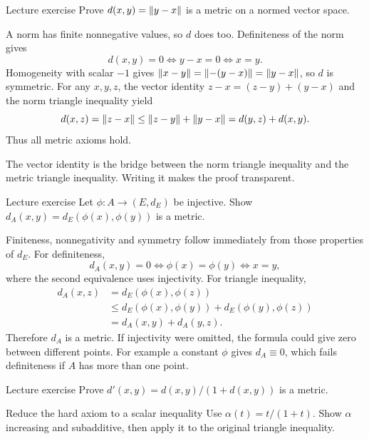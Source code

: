 \begin{exam}{Lecture exercise}
Prove $d(x,y)=\left\lVert y-x\right\rVert$ is a metric on a normed vector space.
\end{exam}
\begin{answer}
A norm has finite nonnegative values, so $d$ does too. Definiteness of the norm gives
\[d(x,y)=0\iff y-x=0\iff x=y.\]
Homogeneity with scalar $-1$ gives $\left\lVert x-y\right\rVert=\left\lVert-(y-x)\right\rVert=\left\lVert y-x\right\rVert$, so $d$ is symmetric. For any $x,y,z$, the vector identity $z-x=(z-y)+(y-x)$ and the norm triangle inequality yield
\[d(x,z)=\left\lVert z-x\right\rVert\le\left\lVert z-y\right\rVert+\left\lVert y-x\right\rVert=d(y,z)+d(x,y).\]
Thus all metric axioms hold.
\end{answer}
\begin{tip}
The vector identity is the bridge between the norm triangle inequality and the metric triangle inequality. Writing it makes the proof transparent.
\end{tip}
\begin{exam}{Lecture exercise}
Let $\phi:A\to(E,d_E)$ be injective. Show $d_A(x,y)=d_E(\phi(x),\phi(y))$ is a metric.
\end{exam}
\begin{answer}
Finiteness, nonnegativity and symmetry follow immediately from those properties of $d_E$. For definiteness,
\[d_A(x,y)=0\iff\phi(x)=\phi(y)\iff x=y,\]
where the second equivalence uses injectivity. For triangle inequality,
\begin{align*}
d_A(x,z)&=d_E(\phi(x),\phi(z))\\
&\le d_E(\phi(x),\phi(y))+d_E(\phi(y),\phi(z))\\
&=d_A(x,y)+d_A(y,z).
\end{align*}
Therefore $d_A$ is a metric. If injectivity were omitted, the formula could give zero between different points. For example a constant $\phi$ gives $d_A\equiv0$, which fails definiteness if $A$ has more than one point.
\end{answer}
\begin{exam}{Lecture exercise}
Prove $d'(x,y)=d(x,y)/(1+d(x,y))$ is a metric.
\end{exam}
\begin{method}{Reduce the hard axiom to a scalar inequality}
Use $\alpha(t)=t/(1+t)$. Show $\alpha$ increasing and subadditive, then apply it to the original triangle inequality.
\end{method}
